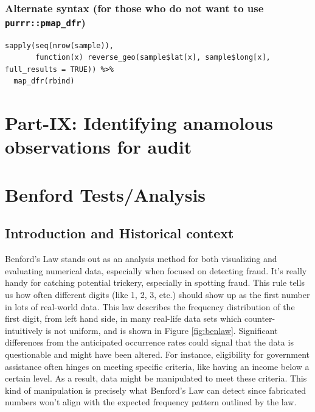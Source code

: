 \documentclass[
]{book}
\begin{document}
\hypertarget{alternate-syntax-for-those-who-do-not-want-to-use-purrrpmap_dfr}{%
\subsection{\texorpdfstring{Alternate syntax (for those who do not want to use \texttt{purrr::pmap\_dfr})}{Alternate syntax (for those who do not want to use purrr::pmap\_dfr)}}\label{alternate-syntax-for-those-who-do-not-want-to-use-purrrpmap_dfr}}

\begin{verbatim}
sapply(seq(nrow(sample)),
       function(x) reverse_geo(sample$lat[x], sample$long[x], full_results = TRUE)) %>% 
  map_dfr(rbind)
\end{verbatim}

\hypertarget{part-ix-identifying-anamolous-observations-for-audit}{%
\chapter*{Part-IX: Identifying anamolous observations for audit}\label{part-ix-identifying-anamolous-observations-for-audit}}

\hypertarget{benford-testsanalysis}{%
\chapter{Benford Tests/Analysis}\label{benford-testsanalysis}}

\hypertarget{introduction-and-historical-context}{%
\section{Introduction and Historical context}\label{introduction-and-historical-context}}

Benford's Law stands out as an analysis method for both visualizing and evaluating numerical data, especially when focused on detecting fraud. It's really handy for catching potential trickery, especially in spotting fraud. This rule tells us how often different digits (like 1, 2, 3, etc.) should show up as the first number in lots of real-world data. This law describes the frequency distribution of the first digit, from left hand side, in many real-life data sets which counter-intuitively is not uniform, and is shown in Figure \ref{fig:benlaw}. Significant differences from the anticipated occurrence rates could signal that the data is questionable and might have been altered. For instance, eligibility for government assistance often hinges on meeting specific criteria, like having an income below a certain level. As a result, data might be manipulated to meet these criteria. This kind of manipulation is precisely what Benford's Law can detect since fabricated numbers won't align with the expected frequency pattern outlined by the law.
\end{document}
